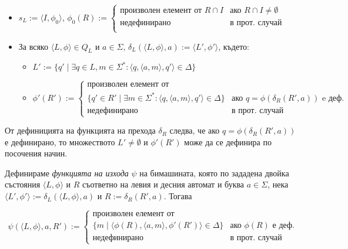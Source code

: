 \documentclass[12pt, oneside]{article}
\theoremstyle{definition}
\begin{document}
\begin{itemize}
	\item \( s_L := \langle I, \phi_0 \rangle \), \( \phi_0(R) :=  
	\begin{cases} 
		\text{произволен елемент от } R \cap I & \text{ако } R \cap I \neq \emptyset \\
		\text{недефинирано} & \text{в прот. случай} \\
	\end{cases} \)
	\item За всяко \( \langle L, \phi \rangle \in Q_L \text{ и } a \in \Sigma \text{, } \delta_L(\langle L, \phi \rangle, a) := \langle L', \phi' \rangle \), където:
	\begin{itemize}
		\item \( L' := \{ q' \mid \exists q \in L, m \in \Sigma^* : \langle q, \langle a, m \rangle, q' \rangle \in \Delta \} \)
		\item \( \phi'(R') := 
		\begin{cases}
			\text{произволен елемент от } \\
			\{ q' \in R' \mid \exists m \in \Sigma^* : \langle q, \langle a, m \rangle, q' \rangle \in \Delta \} & \text{ако } q = \phi(\delta_R(R', a)) \text{ e деф.} \\
			\text{недефинирано} & \text{в прот. случай}
		\end{cases} \)
	\end{itemize}
\end{itemize}

От дефиницията на функцията на прехода \( \delta_R \) следва, че ако \( q = \phi(\delta_R(R', a)) \) е дефинирано, то множеството \( L' \neq \emptyset \) и \( \phi'(R') \) може да се дефинира по посочения начин.

Дефинираме \emph{функцията на изхода} \(\psi\) на бимашината, която по зададена двойка състояния \(\langle L, \phi \rangle\) и \(R\) съответно на левия и десния автомат и буква \( a \in \Sigma \), нека \( \langle L', \phi' \rangle := \delta_L(\langle L, \phi \rangle, a) \) и \( R := \delta_R(R', a) \). Тогава

\[
	\psi(\langle L, \phi \rangle, a, R') := 
	\begin{cases}
		\text{произволен елемент от} \\
		\{ m \mid \langle \phi(R), \langle a, m \rangle, \phi'(R') \rangle \in \Delta \} & \text{ако } \phi(R) \text{ е деф.} \\
		\text{недефинирано} & \text{в прот. случай}
	\end{cases}
\]
\end{document}
